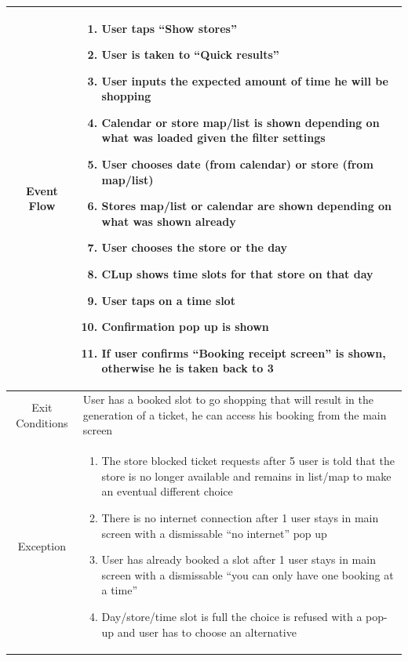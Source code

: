 \begin{enumerate}
\begin{table}[H]
{\begin{tabular}{|c|p{14cm}|}
		Event Flow & \begin{enumerate}
			\item User taps “Show stores”
			\item User is taken to “Quick results”
			\item User inputs the expected amount of time he will be shopping
			\item Calendar or store map/list is shown depending on what was loaded given the filter settings
			\item User chooses date (from calendar) or store (from map/list) 
			\item Stores map/list or calendar are shown depending on what was shown already
			\item User chooses the store or the day
			\item CLup shows time slots for that store on that day
			\item User taps on a time slot
			\item Confirmation pop up is shown
			\item If user confirms “Booking receipt screen” is shown, otherwise he is taken back to 3			
		\end{enumerate}\\
		
		\hline
		Exit Conditions & User has a booked slot to go shopping that will result in the generation of a ticket, he can access his booking from the main screen\\
		\hline
		
		Exception & \begin{enumerate}
			\item The store blocked ticket requests\newline
			after 5 user is told that the store is no longer available and remains in list/map to make an eventual different choice
			
			\item There is no internet connection\newline
			after 1 user stays in main screen with a dismissable “no internet” pop up
			
			\item User has already booked a slot\newline
			after 1 user stays in main screen with a dismissable “you can only have one booking at a time”
			
			\item Day/store/time slot is full\newline
			the choice is refused with a pop-up and user has to choose an alternative
			

\end{enumerate}
\end{tabular}}
\end{table}
\end{enumerate}
